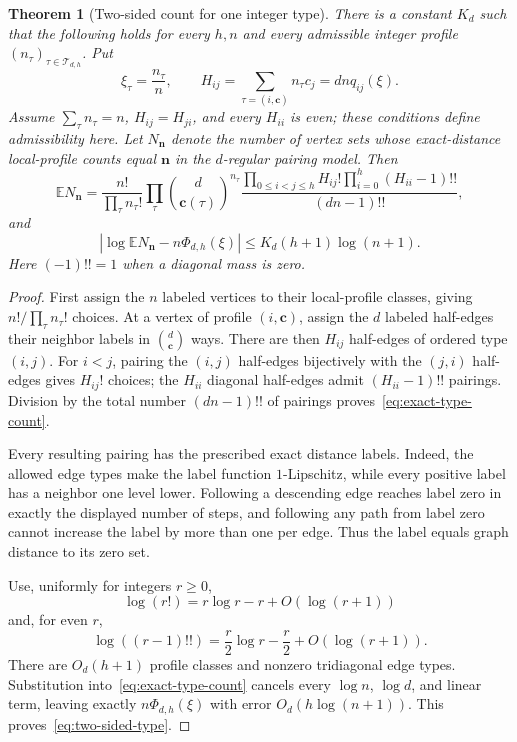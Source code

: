 \documentclass[11pt]{amsart}
\newtheorem{theorem}{Theorem}[section]
\theoremstyle{definition}
\newcommand{\E}{\mathbb E}
\begin{document}
\begin{theorem}[Two-sided count for one integer type]\label{thm:two-sided-type}
There is a constant $K_d$ such that the following holds for every $h,n$ and every admissible integer profile $(n_\tau)_{\tau\in\mathcal T_{d,h}}$.  Put
\[
 \xi_\tau=\frac{n_\tau}{n},
 \qquad
 H_{ij}=\sum_{\tau=(i,\mathbf c)}n_\tau c_j=dnq_{ij}(\xi).
\]
Assume $\sum_\tau n_\tau=n$, $H_{ij}=H_{ji}$, and every $H_{ii}$ is even; these conditions define admissibility here.  Let $N_{\mathbf n}$ denote the number of vertex sets whose exact-distance local-profile counts equal $\mathbf n$ in the $d$-regular pairing model.  Then
\begin{equation}\label{eq:exact-type-count}
 \E N_{\mathbf n}
 =\frac{n!}{\prod_\tau n_\tau!}
  \prod_\tau\binom d{\mathbf c(\tau)}^{n_\tau}
  \frac{
   \displaystyle\prod_{0\le i<j\le h}H_{ij}!
   \prod_{i=0}^h(H_{ii}-1)!!
  }{(dn-1)!!},
\end{equation}
and
\begin{equation}\label{eq:two-sided-type}
 \left|
  \log\E N_{\mathbf n}-n\Phi_{d,h}(\xi)
 \right|
 \le K_d(h+1)\log(n+1).
\end{equation}
Here $(-1)!!=1$ when a diagonal mass is zero.
\end{theorem}

\begin{proof}
First assign the $n$ labeled vertices to their local-profile classes, giving $n!/\prod_\tau n_\tau!$ choices.  At a vertex of profile $(i,\mathbf c)$, assign the $d$ labeled half-edges their neighbor labels in $\binom d{\mathbf c}$ ways.  There are then $H_{ij}$ half-edges of ordered type $(i,j)$.  For $i<j$, pairing the $(i,j)$ half-edges bijectively with the $(j,i)$ half-edges gives $H_{ij}!$ choices; the $H_{ii}$ diagonal half-edges admit $(H_{ii}-1)!!$ pairings.  Division by the total number $(dn-1)!!$ of pairings proves~\eqref{eq:exact-type-count}.

Every resulting pairing has the prescribed exact distance labels.  Indeed, the allowed edge types make the label function $1$-Lipschitz, while every positive label has a neighbor one level lower.  Following a descending edge reaches label zero in exactly the displayed number of steps, and following any path from label zero cannot increase the label by more than one per edge.  Thus the label equals graph distance to its zero set.

Use, uniformly for integers $r\ge0$,
\[
 \log(r!)=r\log r-r+O(\log(r+1))
\]
and, for even $r$,
\[
 \log((r-1)!!)=\frac r2\log r-\frac r2+O(\log(r+1)).
\]
There are $O_d(h+1)$ profile classes and nonzero tridiagonal edge types.  Substitution into~\eqref{eq:exact-type-count} cancels every $\log n$, $\log d$, and linear term, leaving exactly $n\Phi_{d,h}(\xi)$ with error $O_d(h\log(n+1))$.  This proves~\eqref{eq:two-sided-type}.
\end{proof}
\end{document}

